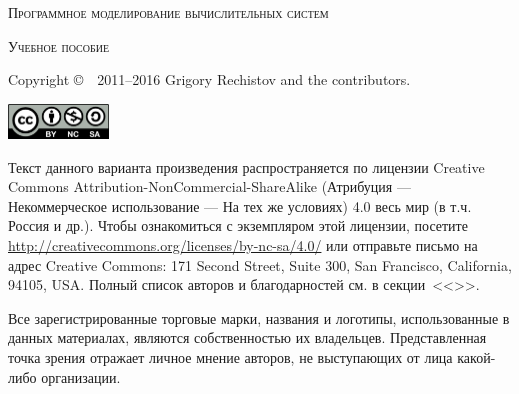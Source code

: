 
\thispagestyle{empty}


\begin{center}
    \Huge\textsc{Программное моделирование вычислительных систем}\par
\end{center}

\vspace{0.5cm}

\begin{center}
	\Large\textsc{Учебное пособие}\par
\end{center}


\newlength{\centeroffset}
\setlength{\centeroffset}{-0.5\oddsidemargin}
\addtolength{\centeroffset}{0.5\evensidemargin}
\noindent\hspace*{\centeroffset}

\pagebreak
\thispagestyle{empty}

\begin{small} 
Copyright \copyright~~2011–2016 Grigory Rechistov and the contributors. %
\begin{center}
    \includegraphics[width=0.2\textwidth]{cc-by-nc-sa.png}
\end{center}

Текст данного варианта произведения распространяется по лицензии Creative Commons At\-tri\-bu\-tion-Non\-Com\-mer\-cial-Share\-Alike (Атрибуция — Некоммерческое использование — На тех же условиях) 4.0 весь мир (в т.ч. Россия и др.). Чтобы ознакомиться с экземпляром этой лицензии, посетите \url{http://creativecommons.org/licenses/by-nc-sa/4.0/} или отправьте письмо на адрес Creative Commons: 171 Second Street, Suite 300, San Francisco, California, 94105, USA. 
Полный список авторов и благодарностей см. в секции~<<>>.

Все зарегистрированные торговые марки, названия и логотипы, использованные в данных материалах, являются собственностью их владельцев. Представленная точка зрения отражает личное мнение авторов, не выступающих от лица какой-либо организации.
\end{small}

